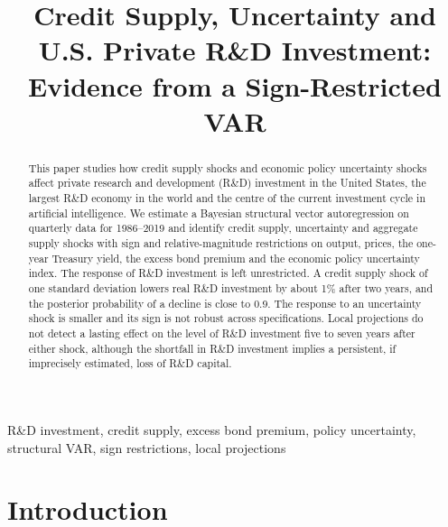 \documentclass[conference]{IEEEtran}
\begin{document}
\title{Credit Supply, Uncertainty and U.S. Private R\&D Investment: Evidence from a Sign-Restricted VAR}

\author{
}

\maketitle

\begin{abstract}
This paper studies how credit supply shocks and economic policy uncertainty
shocks affect private research and development (R\&D) investment in the
United States, the largest R\&D economy in the world and the centre of the
current investment cycle in artificial intelligence. We estimate a Bayesian structural vector
autoregression on quarterly data for 1986--2019 and identify credit supply,
uncertainty and aggregate supply shocks with sign and relative-magnitude
restrictions on output, prices, the one-year Treasury yield, the excess bond
premium and the economic policy uncertainty index. The response of R\&D
investment is left unrestricted. A credit supply shock of one standard
deviation lowers real R\&D investment by about 1\% after two years, and the
posterior probability of a decline is close to 0.9. The response to an
uncertainty shock is smaller and its sign is not robust across
specifications. Local projections do not detect a lasting effect on the level
of R\&D investment five to seven years after either shock, although the
shortfall in R\&D investment implies a persistent, if imprecisely estimated,
loss of R\&D capital.
\end{abstract}

\begin{IEEEkeywords}
R\&D investment, credit supply, excess bond premium, policy uncertainty,
structural VAR, sign restrictions, local projections
\end{IEEEkeywords}

\section{Introduction}
\end{document}
